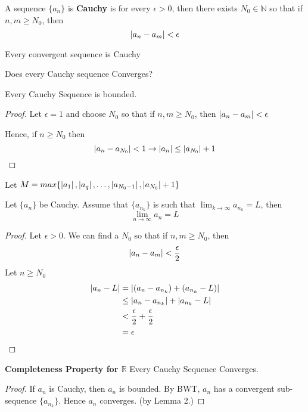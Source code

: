 \begin{defn}
A sequence $\{a_n\}$ is \textbf{Cauchy} is for every $\epsilon > 0$, then there exists $N_0 \in \mathbb{N}$ so that if $n,m \geq N_0$, then 
\[
\left| a_n - a_m \right| < \epsilon
\]
\end{defn}

\begin{prop}
Every convergent sequence is Cauchy
\end{prop}

\begin{ques}
Does every Cauchy sequence Converges?
\end{ques}

\begin{lem}
Every Cauchy Sequence is bounded.
\end{lem}

\begin{proof}
Let $\epsilon = 1$ and choose $N_0$ so that if $n,m \geq N_0$, then $\left| a_n - a_m \right| < \epsilon$

Hence, if $n\geq N_0$ then 
\[
\left| a_n - a_{N_0} \right| < 1 \to \left| a_n \right| \leq \left| a_{N_0}  \right| + 1
\]
\end{proof}

Let $M = max\{\left| a_1 \right|,\left| a_q \right|,\dots , \left| a_{N_0 - 1} \right|,\left| a_{N_0} \right|+1\}$

\begin{lem}
Let $\{a_n\}$ be Cauchy. Assume that $\{a_{n_k}\}$ is such that $\lim_{k\to\infty} a_{n_k} = L$, then 
\[
\lim_{n\to\infty} a_n = L
\]
\end{lem}

\begin{proof}
Let $\epsilon > 0$. We can find a $N_0$ so that if $n,m\geq N_0$, then
\[
\left| a_n - a_m  \right| < \frac{\epsilon}{2}
\]
Let $n\geq N_0 $
\begin{align*}
    \left| a_n - L \right| & = \left| (a_n - a_{n_k}) + (a_{n_k} - L) \right|\\
    & \leq \left| a_n - a_{n_k} \right| + \left| a_{n_k} - L \right|\\
    & < \frac{\epsilon}{2 } + \frac{\epsilon}{2}\\
    & = \epsilon
\end{align*}
\end{proof}

\begin{thm} \textbf{Completeness Property for $\mathbb{R}$}
Every Cauchy Sequence Converges. 
\end{thm}

\begin{proof}
If $a_n$ is Cauchy, then $a_n$ is bounded. By BWT, $a_n$ has a convergent sub-sequence $\{a_{n_k}\}$. Hence $a_n$ converges. (by Lemma 2.)
\end{proof}


